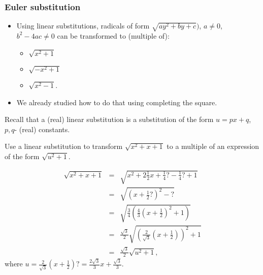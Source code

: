 \begin{frame}
\frametitle{Euler substitution}
\begin{itemize}
\item Using linear substitutions, radicals of form  $\sqrt{ay^2+by+c})$, $a\neq 0$, $b^2-4ac\neq 0$ can be transformed to (multiple of):
\begin{itemize}
\item $\sqrt{x^2+1}$ 
\item $\sqrt{-x^2+1}$
\item $\sqrt{x^2-1}$.
\end{itemize}
\item We already studied how to do that using completing the square. 
\end{itemize}
\end{frame}
\begin{frame}
Recall that a (real) linear substitution is a substitution of the form $u=px+q$, $p,q$- (real) constants.
\begin{example}
Use a linear substitution to transform $\sqrt{x^2+x+1}$ to a multiple of an expression of the form $\sqrt{u^2+1}$. 

\[
\begin{array}{rcl}
\sqrt{x^2+x+1}&=&\sqrt{ x^2+2\frac{1}{2}x +\frac{1}{4}\textbf{?}-\frac{1}{4}\textbf{?} +1} \\
&=& \sqrt{ \left(x+\frac{1}{2}\textbf{?} \right)^2-\textbf{?} }\\
&=&\sqrt{\frac{3}{4}\left( \frac{4}{3} \left(x+\frac{1}{2}\right)^2+1 \right)}\\
&=&\frac{\sqrt{3}}{2}\sqrt{\left(\frac{2}{\sqrt{3}}\left( x+\frac{1}{2}\right)\right)^2+1}\\
&=& \frac{\sqrt{3}}{2} \sqrt{u^2+1},
\end{array}
\]
where $u=\frac{2}{\sqrt{3}}\left( x+\frac{1}{2}\right) \textbf{?}=\frac{2\sqrt{3}}{3}x+\frac{\sqrt{3}}{3}$.
\end{example}
\vspace{5cm}
\end{frame}
